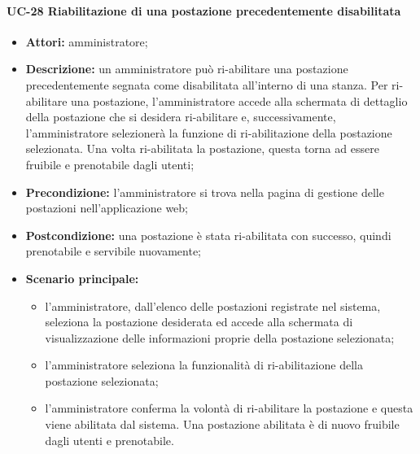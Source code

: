 \paragraph{UC-28 Riabilitazione di una postazione precedentemente disabilitata}
\begin{itemize}
    \item \textbf{Attori:} amministratore;
    \item \textbf{Descrizione:} un amministratore pu\`{o} ri-abilitare una postazione precedentemente segnata come disabilitata all'interno di una stanza. Per ri-abilitare una postazione, l'amministratore accede alla schermata di dettaglio della postazione che si desidera ri-abilitare e, successivamente, l'amministratore selezionerà la funzione di ri-abilitazione della postazione selezionata. Una volta ri-abilitata la postazione, questa torna ad essere fruibile e prenotabile dagli utenti;
    \item \textbf{Precondizione:} l'amministratore si trova nella pagina di gestione delle postazioni nell'applicazione web;
    \item \textbf{Postcondizione:} una postazione \`{e} stata ri-abilitata con successo, quindi prenotabile e servibile nuovamente;
    \item \textbf{Scenario principale:}
    \begin{itemize}
        \item l'amministratore, dall'elenco delle postazioni registrate nel sistema, seleziona la postazione desiderata ed accede alla schermata di visualizzazione delle informazioni proprie della postazione selezionata;
        \item l'amministratore seleziona la funzionalità di ri-abilitazione della postazione selezionata;
        \item l'amministratore conferma la volontà di ri-abilitare la postazione e questa viene abilitata dal sistema. Una postazione abilitata è di nuovo fruibile dagli utenti e prenotabile.
    \end{itemize}
\end{itemize}